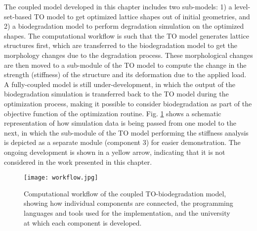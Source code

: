 The coupled model developed in this chapter includes two sub-models: 1) a level-set-based TO model to get optimized lattice shapes out of initial geometries, and 2) a biodegradation model to perform degradation simulation on the optimized shapes. The computational workflow is such that the TO model generates lattice structures first, which are transferred to the biodegradation model to get the morphology changes due to the degradation process. These morphological changes are then moved to a sub-module of the TO model to compute the change in the strength (stiffness) of the structure and its deformation due to the applied load. A fully-coupled model is still under-development, in which the output of the biodegradation simulation is transferred back to the TO model during the optimization process, making it possible to consider biodegradation as part of the objective function of the optimization routine. Fig. \ref{fig:infill_workflow} shows a schematic representation of how simulation data is being passed from one model to the next, in which the sub-module of the TO model performing the stiffness analysis is depicted as a separate module (component 3) for easier demonstration. The ongoing development is shown in a yellow arrow, indicating that it is not considered in the work presented in this chapter.

\begin{figure}[h]
\centering
\medskip
\texttt{[image: workflow.jpg]}
\caption[Computational workflow of the coupled TO-biodegradation model]{Computational workflow of the coupled TO-biodegradation model, showing how individual components are connected, the programming languages and tools used for the implementation, and the university at which each component is developed.} \label{fig:infill_workflow}
\end{figure}

